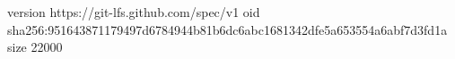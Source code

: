 version https://git-lfs.github.com/spec/v1
oid sha256:951643871179497d6784944b81b6dc6abc1681342dfe5a653554a6abf7d3fd1a
size 22000
